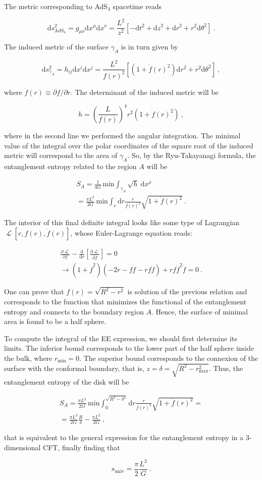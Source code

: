 \documentclass[twocolumn]{revtex4}
\providecommand{\eq}[2]{
    \begin{equation}
        #2
    \label{eq:#1}
    \end{equation}
}
\providecommand{\eqgat}[2]{
    \begin{gather}
        #2
    \label{eq:#1}
    \end{gather}
}
\DeclareMathOperator{\calL}{\mathcal{L}}
\begin{document}
The metric corresponding to AdS$_4$ spacetime reads
\eq{1Ametric}{
    \mathrm{d}s^2_{\text{AdS}_4} = g_{\mu \nu} \mathrm{d}x^\mu \mathrm{d}x^\nu = 
    \frac{L^2}{z^2} [ -\mathrm{d}t^2 + \mathrm{d}z^2 + \mathrm{d}r^2 + r^2 \mathrm{d}\theta^2 ] \ . \nonumber
}
The induced metric of the surface $\gamma_A$ is in turn given by
\eq{1gammaAmetric}{
    \mathrm{d}s^2_{\gamma_A} = h_{i j} \mathrm{d}x^i \mathrm{d}x^j = 
    \frac{L^2}{f(r)^2} \left[ \left( 1+ \dot{f}(r)^2 \right) \mathrm{d}r^2 + r^2 \mathrm{d}\theta^2 \right] \ , \nonumber
}
where $ \dot{f}(r) \equiv \partial f/\partial r$. The determinant of the induced metric will be
\eq{1h}{
    h = \left( \frac{L}{f(r)} \right) ^4 r^2 ( 1 + \dot{f}(r)^2 ) \ , \nonumber
}
where in the second line we performed the angular integration.
The minimal value of the integral over the polar coordinates of the square root of the induced metric will correspond to the area of $\gamma_A$. So, by the Ryu-Takayanagi formula, the entanglement entropy related to the region $A$ will be
\eqgat{1EEA}{
    S_A = \frac{1}{4G} \, \text{min} \int_{\gamma_A} \sqrt{h} \ \mathrm{d}x^\rho \nonumber \\
    = \frac{\pi L^2}{2G} \, \text{min} \int_r \mathrm{d}r \frac{r}{f(r)^2} \sqrt{ 1 + \dot{f}(r)^2 } \ .\nonumber
}
The interior of this final definite integral looks like some type of Lagrangian $\calL [r,f(r),\dot{f}(r)]$, whose Euler-Lagrange equation reads:
\eqgat{1EL}{
    \frac{\partial \calL}{\partial f} - \frac{\mathrm{d}}{\mathrm{d}r} \left[ \frac{\partial \calL}{\partial \dot{f}} \right] = 0 \nonumber \\
    \longrightarrow \left( 1+\dot{f}^2 \right) \left( -2r-f\dot{f}-rf\ddot{f} \right) + rf\dot{f}^2\ddot{f} = 0 \ .\nonumber
}
One can prove that $f(r) = \sqrt{R^2 - r^2}$ is solution of the previous relation and corresponds to the function that minimizes the functional of the entanglement entropy and connects to the boundary region $A$. Hence, the surface of minimal area is found to be a half sphere.

To compute the integral of the EE expression, we should first determine its limits. The inferior bound corresponds to the lower part of the half sphere inside the bulk, where $r_\text{min}=0$. The superior bound corresponds to the connexion of the surface with the conformal boundary, that is, $z=\delta=\sqrt{R^2-r_\text{max}^2}$. Thus, the entanglement entropy of the disk will be
\eqgat{1sol}{
    S_A = \frac{\pi L^2}{2G} \, \text{min} \int_0^{\sqrt{R^2-\delta^2}} \mathrm{d}r \frac{r}{f(r)^2} \sqrt{ 1 + \dot{f}(r)^2 } = \nonumber \\
    = \frac{\pi L^2}{2G} \frac{R}{\delta} - \frac{\pi L^2}{2G} \ , \nonumber
}
that is equivalent to the general expression for the entanglement entropy in a 3-dimensional CFT, finally finding that
\eq{F}{
    s_\text{univ} = \frac{\pi}{2} \frac{L^2}{G} \ . \nonumber
}
\end{document}
